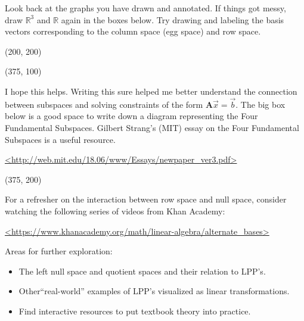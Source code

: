 \documentclass[11pt]{article}
\theoremstyle{plain} %
\theoremstyle{definition}
\theoremstyle{remark}
\begin{document}
Look back at the graphs you have drawn and annotated. If things got messy, draw  $\mathbb{R}^3$ and  $\mathbb{R}$ again in the boxes below. Try drawing and labeling the basis vectors corresponding to the column space (egg space) and row space.

\begin{center}\framebox(200, 200){}\end{center}

\begin{center}\framebox(375, 100){}\end{center}


I hope this helps. Writing this sure helped me better understand the connection between subspaces and solving constraints of the form $\mathbf{A}\vec{x}=\vec{b}$. The big box below is a good space to write down a diagram representing the Four Fundamental Subspaces. Gilbert Strang's (MIT) essay on the Four Fundamental Subspaces is a useful resource. 
\bigskip

\url{<http://web.mit.edu/18.06/www/Essays/newpaper_ver3.pdf>}

\begin{center}\framebox(375, 200){}\end{center}

For a refresher on the interaction between row space and null space, consider watching the following series of videos from Khan Academy:

\bigskip

\url{<https://www.khanacademy.org/math/linear-algebra/alternate_bases>}

\bigskip

Areas for further exploration:

\begin{itemize}
  \item The left null space and quotient spaces and their relation to LPP's.
  \item Other``real-world'' examples of LPP's visualized as linear transformations.
  \item Find interactive resources to put textbook theory into practice.
    
\end{itemize}
\end{document}
